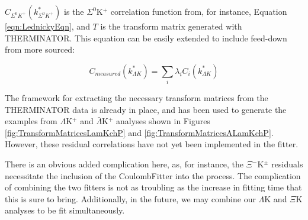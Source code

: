 \documentclass[../AnalysisNoteJBuxton.tex]{subfiles}
\begin{document}
$C_{\Sigma^{0}K^{+}}(k^{*}_{\Sigma^{0}K^{+}})$ is the $\Sigma^{0}$K$^{+}$ correlation function from, for instance, Equation \ref{eqn:LednickyEqn}, and $T$ is the transform matrix generated with THERMINATOR.  This equation can be easily extended to include feed-down from more sourced:

\begin{equation}
 C_{measured}(k^{*}_{\Lambda K}) = \sum\limits_{i}  \lambda_{i}C_{i}(k^{*}_{\Lambda K})
\label{eqn:Residuals}
\end{equation}

The framework for extracting the necessary transform matrices from the THERMINATOR data is already in place, and has been used to generate the examples from $\Lambda$K$^{+}$ and $\bar{\Lambda}$K$^{+}$ analyses shown in Figures \ref{fig:TransformMatricesLamKchP} and \ref{fig:TransformMatricesALamKchP}.  However, these residual correlations have not yet been implemented in the fitter.

There is an obvious added complication here, as, for instance, the $\Xi^{-}$K$^{\pm}$ residuals necessitate the inclusion of the CoulombFitter into the process.  The complication of combining the two fitters is not as troubling as the increase in fitting time that this is sure to bring.  Additionally, in the future, we may combine our $\Lambda$K and $\Xi$K analyses to be fit simultaneously.
\end{document}
